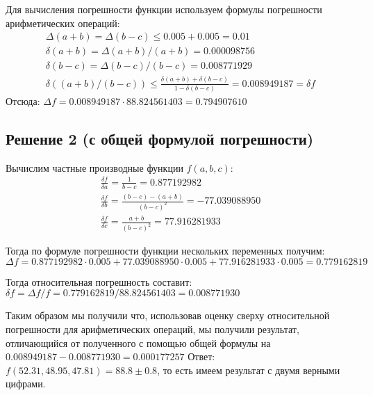 \documentclass[a4paper,12pt]{report} %
\begin{document}
Для вычисления погрешности функции используем формулы погрешности арифметических операций:
\begin{gather*}
	\Delta(a + b) = \Delta(b - c) \leq 0.005 + 0.005 = 0.01\\
	\delta(a + b) = \Delta(a + b) / (a + b) = 0.000098756\\
	\delta(b - c) = \Delta(b - c) / (b - c) = 0.008771929\\
	\delta((a + b)/(b - c)) \leq \frac{\delta(a + b) + \delta(b - c)}{1 - \delta(b - c)} = 0.008949187 = \delta f
\end{gather*}
Отсюда: $ \Delta f = 0.008949187 \cdot 88.824561403 = 0.794907610$

\newpage
\subsection*{Решение 2 (с общей формулой погрешности)}

Вычислим частные производные функции $f(a, b, c)$:
\begin{gather*}
	\frac{\delta f}{\delta a} = \frac{1}{b - c} = 0.877192982\\
	\frac{\delta f}{\delta b} = \frac{(b-c) - (a + b)}{(b-c)^2} = -77.039088950\\
	\frac{\delta f}{\delta c} = \frac{a + b}{(b-c)^2} = 77.916281933
\end{gather*}

Тогда по формуле погрешности функции нескольких переменных получим:
\newline
$\Delta f = 0.877192982\cdot0.005 + 77.039088950\cdot0.005 + 77.916281933\cdot0.005 = 0.779162819$

Тогда относительная погрешность составит: $\delta f = \Delta f / f = 0.779162819 / 88.824561403 = 0.008771930$

Таким образом мы получили что, использовав оценку сверху относительной погрешности для арифметических операций, мы  получили результат, отличающийся от полученного с помощью общей формулы на $0.008949187 - 0.008771930 = 0.000177257$
\newline
Ответ: $f(52.31, 48.95, 47.81) = 88.8 \pm 0.8$, то есть имеем результат с двумя верными цифрами.
\end{document}
